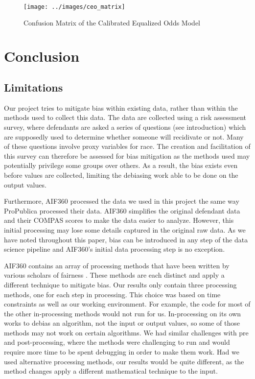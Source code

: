\documentclass[,article,,moreauthors,pdftex]{mdpi}
\begin{document}
\begin{figure}

{\centering \texttt{[image: ../images/ceo\_matrix]} 

}

\caption{Confusion Matrix of the Calibrated Equalized Odds Model}\label{fig:ceo matrix}
\end{figure}

\hypertarget{conclusion}{%
\section{Conclusion}\label{conclusion}}

\hypertarget{limitations}{%
\subsection{Limitations}\label{limitations}}

Our project tries to mitigate bias within existing data, rather than
within the methods used to collect this data. The data are collected
using a risk assessment survey, where defendants are asked a series of
questions (see introduction) which are supposedly used to determine
whether someone will recidivate or not. Many of these questions involve
proxy variables for race. The creation and facilitation of this survey
can therefore be assessed for bias mitigation as the methods used may
potentially privilege some groups over others. As a result, the bias
exists even before values are collected, limiting the debiasing work
able to be done on the output values.

Furthermore, AIF360 processed the data we used in this project the same
way ProPublica processed their data. AIF360 simplifies the original
defendant data and their COMPAS scores to make the data easier to
analyze. However, this initial processing may lose some details captured
in the original raw data. As we have noted throughout this paper, bias
can be introduced in any step of the data science pipeline and AIF360's
initial data processing step is no exception.

AIF360 contains an array of processing methods that have been written by
various scholars of fairness \citep{aif360-oct-2018}. These methods are
each distinct and apply a different technique to mitigate bias. Our
results only contain three processing methods, one for each step in
processing. This choice was based on time constraints as well as our
working environment. For example, the code for most of the other
in-processing methods would not run for us. In-processing on its own
works to debias an algorithm, not the input or output values, so some of
those methods may not work on certain algorithms. We had similar
challenges with pre and post-processing, where the methods were
challenging to run and would require more time to be spent debugging in
order to make them work. Had we used alternative processing methods, our
results would be quite different, as the method changes apply a
different mathematical technique to the input.
\end{document}
